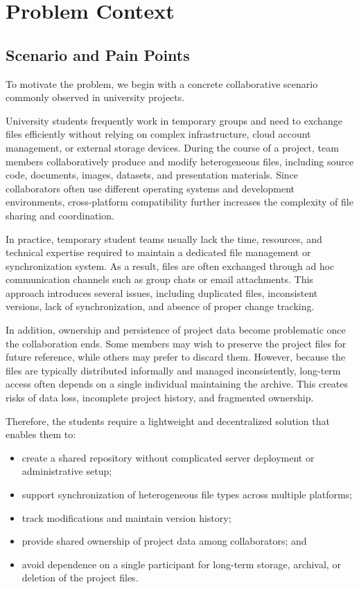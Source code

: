 \section{Problem Context}

\subsection{Scenario and Pain Points}

To motivate the problem, we begin with a concrete collaborative scenario commonly observed in university projects.\par
University students frequently work in temporary groups and need to exchange files efficiently without relying on complex infrastructure, cloud account management, or external storage devices. During the course of a project, team members collaboratively produce and modify heterogeneous files, including source code, documents, images, datasets, and presentation materials. Since collaborators often use different operating systems and development environments, cross-platform compatibility further increases the complexity of file sharing and coordination.\par
In practice, temporary student teams usually lack the time, resources, and technical expertise required to maintain a dedicated file management or synchronization system. As a result, files are often exchanged through ad hoc communication channels such as group chats or email attachments. This approach introduces several issues, including duplicated files, inconsistent versions, lack of synchronization, and absence of proper change tracking.\par
In addition, ownership and persistence of project data become problematic once the collaboration ends. Some members may wish to preserve the project files for future reference, while others may prefer to discard them. However, because the files are typically distributed informally and managed inconsistently, long-term access often depends on a single individual maintaining the archive. This creates risks of data loss, incomplete project history, and fragmented ownership.\par
Therefore, the students require a lightweight and decentralized solution that enables them to:
\begin{itemize}
    \item create a shared repository without complicated server deployment or administrative setup;
    \item support synchronization of heterogeneous file types across multiple platforms;
    \item track modifications and maintain version history;
    \item provide shared ownership of project data among collaborators; and
    \item avoid dependence on a single participant for long-term storage, archival, or deletion of the project files.
\end{itemize}

